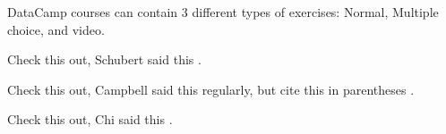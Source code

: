 \documentclass{tise_style}
\begin{document}
DataCamp courses can contain 3 different types of exercises: Normal, Multiple choice, and video.


Check this out, Schubert said this \cite{Schubert13}.


Check this out, Campbell said this \cite{Campbell02} regularly, but cite this in parentheses \citep{Campbell02}.


Check this out, Chi said this \cite{Chi81}.




\end{document}
